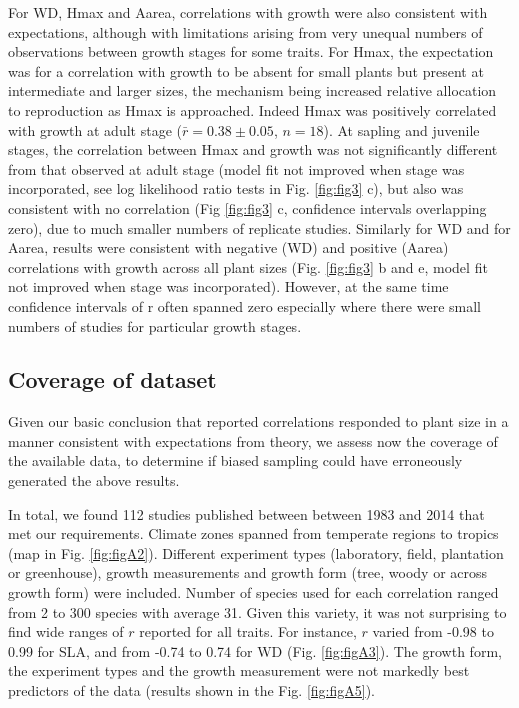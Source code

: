 \documentclass[a4paper]{article}\usepackage[]{graphicx}\usepackage[]{color}
\begin{document}
For WD, Hmax and Aarea, correlations with growth were also consistent with expectations, although with limitations arising from very unequal numbers of observations between growth stages for some traits. For Hmax, the expectation was for a correlation with growth to be absent for small plants but present at intermediate and larger sizes, the mechanism being increased relative allocation to reproduction as Hmax is approached. Indeed Hmax was positively correlated with growth at adult stage ($\bar{r}= 0.38 \pm 0.05$, $n=18$). At sapling and juvenile stages, the correlation between Hmax and growth was not significantly different from that observed at adult stage (model fit not improved when stage was incorporated, see log likelihood ratio tests in Fig. \ref{fig:fig3} c), but also was consistent with no correlation (Fig \ref{fig:fig3} c, confidence intervals overlapping zero), due to much smaller numbers of replicate studies. Similarly for WD and for Aarea, results were consistent with negative (WD) and positive (Aarea) correlations with growth across all plant sizes (Fig. \ref{fig:fig3} b and e, model fit not improved when stage was incorporated). However, at the same time confidence intervals of r often spanned zero especially where there were small numbers of studies for particular growth stages.

\subsection*{Coverage of dataset}

Given our basic conclusion that reported correlations responded to plant size in a manner consistent with expectations from theory, we assess now the coverage of the available data, to determine if biased sampling could have erroneously generated the above results.

In total, we found 112 studies published between between 1983 and 2014 that met our requirements. Climate zones spanned from temperate regions to  tropics (map in Fig. \ref{fig:figA2}). Different experiment types (laboratory, field, plantation or greenhouse), growth measurements and growth form (tree, woody or across growth form) were included. Number of species used for each correlation ranged from 2 to 300 species with average 31. Given this variety, it was not surprising to find wide ranges of $r$ reported for all traits. For instance, $r$ varied from -0.98 to 0.99 for SLA, and from -0.74 to 0.74 for WD (Fig. \ref{fig:figA3}). The growth form, the experiment types and the growth measurement were not markedly best predictors of the data (results shown in the Fig. \ref{fig:figA5}).
\end{document}
